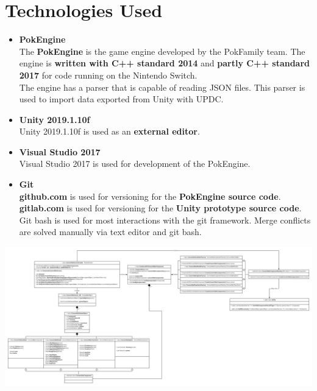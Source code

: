 \documentclass[12pt,a4paper]{article}
\begin{document}
\section{Technologies Used}
\begin{itemize}
	\item \textbf{PokEngine}\\
		The \textbf{PokEngine} is the game engine developed by the PokFamily team. The engine is \textbf{written with C++ standard 2014} and \textbf{partly C++ standard 2017} for code running on the Nintendo Switch.\\
The engine has a parser that is capable of reading JSON files. This parser is used to import data exported from Unity with UPDC.

	\item \textbf{Unity 2019.1.10f}\\
		Unity 2019.1.10f is used as an \textbf{external editor}.
	
	\item \textbf{Visual Studio 2017}\\
		Visual Studio 2017 is used for development of the PokEngine.
	
	\item \textbf{Git}\\
		\textbf{github.com} is used for versioning for the \textbf{PokEngine source code}. \textbf{gitlab.com} is used for versioning for the \textbf{Unity prototype source code}. Git bash is used for most interactions with the git framework. Merge conflicts are solved manually via text editor and git bash.		
\end{itemize}

\newpage
\begin{landscape}
\includegraphics[scale=0.19]{CSCUML}
\end{landscape}
\newpage
\end{document}
